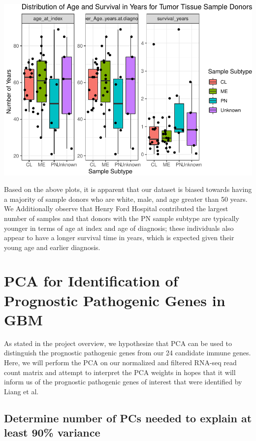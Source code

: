 \documentclass[
]{article}
\begin{document}
\includegraphics{LiuKevin_Final_Project_files/figure-latex/unnamed-chunk-9-1.pdf}

Based on the above plots, it is apparent that our dataset is biased
towards having a majority of sample donors who are white, male, and age
greater than 50 years. We Additionally observe that Henry Ford Hospital
contributed the largest number of samples and that donors with the PN
sample subtype are typically younger in terms of age at index and age of
diagnosis; these individuals also appear to have a longer survival time
in years, which is expected given their young age and earlier diagnosis.

\newpage

\hypertarget{pca-for-identification-of-prognostic-pathogenic-genes-in-gbm}{%
\section{PCA for Identification of Prognostic Pathogenic Genes in
GBM}\label{pca-for-identification-of-prognostic-pathogenic-genes-in-gbm}}

As stated in the project overview, we hypothesize that PCA can be used
to distinguish the prognostic pathogenic genes from our 24 candidate
immune genes. Here, we will perform the PCA on our normalized and
filtered RNA-seq read count matrix and attempt to interpret the PCA
weights in hopes that it will inform us of the prognostic pathogenic
genes of interest that were identified by Liang et al.

\hypertarget{determine-number-of-pcs-needed-to-explain-at-least-90-variance}{%
\subsection{Determine number of PCs needed to explain at least 90\%
variance}\label{determine-number-of-pcs-needed-to-explain-at-least-90-variance}}
\end{document}
